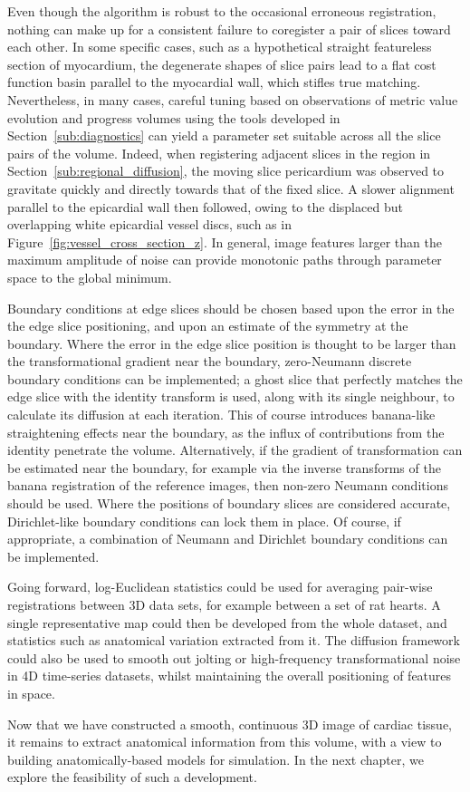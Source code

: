   Even though the algorithm is robust to the occasional erroneous registration, nothing can make up for a consistent failure to coregister a pair of slices toward each other. In some specific cases, such as a hypothetical straight featureless section of myocardium, the degenerate shapes of slice pairs lead to a flat cost function basin parallel to the myocardial wall, which stifles true matching. Nevertheless, in many cases, careful tuning based on observations of metric value evolution and progress volumes using the tools developed in Section~\ref{sub:diagnostics} can yield a parameter set suitable across all the slice pairs of the volume. Indeed, when registering adjacent slices in the region in Section~\ref{sub:regional_diffusion}, the moving slice pericardium was observed to gravitate quickly and directly towards that of the fixed slice. A slower alignment parallel to the epicardial wall then followed, owing to the displaced but overlapping white epicardial vessel discs, such as in Figure~\ref{fig:vessel_cross_section_z}. In general, image features larger than the maximum amplitude of noise can provide monotonic paths through parameter space to the global minimum.
  
  Boundary conditions at edge slices should be chosen based upon the error in the the edge slice positioning, and upon an estimate of the symmetry at the boundary. Where the error in the edge slice position is thought to be larger than the transformational gradient near the boundary, zero-Neumann discrete boundary conditions can be implemented; a ghost slice that perfectly matches the edge slice with the identity transform is used, along with its single neighbour, to calculate its diffusion at each iteration. This of course introduces banana-like straightening effects near the boundary, as the influx of contributions from the identity penetrate the volume. Alternatively, if the gradient of transformation can be estimated near the boundary, for example via the inverse transforms of the banana registration of the reference images, then non-zero Neumann conditions should be used. Where the positions of boundary slices are considered accurate, Dirichlet-like boundary conditions can lock them in place. Of course, if appropriate, a combination of Neumann and Dirichlet boundary conditions can be implemented.
  
  Going forward, log-Euclidean statistics could be used for averaging pair-wise registrations between 3D data sets, for example between a set of rat hearts. A single representative map could then be developed from the whole dataset, and statistics such as anatomical variation extracted from it. The diffusion framework could also be used to smooth out jolting or high-frequency transformational noise in 4D time-series datasets, whilst maintaining the overall positioning of features in space.
  
  Now that we have constructed a smooth, continuous 3D image of cardiac tissue, it remains to extract anatomical information from this volume, with a view to building anatomically-based models for simulation. In the next chapter, we explore the feasibility of such a development.
